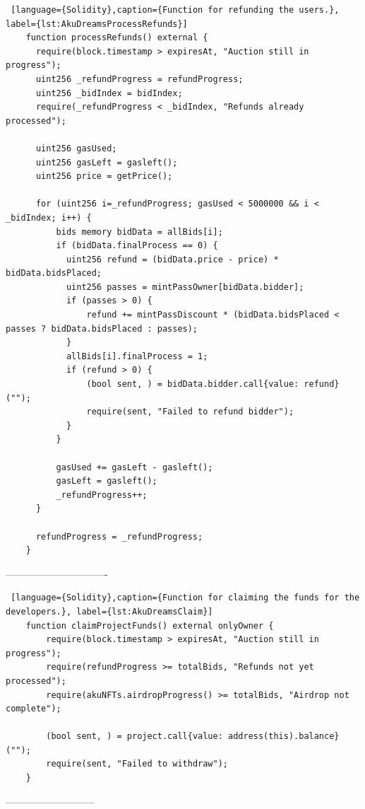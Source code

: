 \begin{lstlisting} [language={Solidity},caption={Function for refunding the users.}, label={lst:AkuDreamsProcessRefunds}]
    function processRefunds() external {
      require(block.timestamp > expiresAt, "Auction still in progress");
      uint256 _refundProgress = refundProgress;
      uint256 _bidIndex = bidIndex;
      require(_refundProgress < _bidIndex, "Refunds already processed");
      
      uint256 gasUsed;
      uint256 gasLeft = gasleft();
      uint256 price = getPrice();
      
      for (uint256 i=_refundProgress; gasUsed < 5000000 && i < _bidIndex; i++) {
          bids memory bidData = allBids[i];
          if (bidData.finalProcess == 0) {
            uint256 refund = (bidData.price - price) * bidData.bidsPlaced;
            uint256 passes = mintPassOwner[bidData.bidder];
            if (passes > 0) {
                refund += mintPassDiscount * (bidData.bidsPlaced < passes ? bidData.bidsPlaced : passes);
            }
            allBids[i].finalProcess = 1;
            if (refund > 0) {
                (bool sent, ) = bidData.bidder.call{value: refund}("");
                require(sent, "Failed to refund bidder");
            }
          }
          
          gasUsed += gasLeft - gasleft();
          gasLeft = gasleft();
          _refundProgress++;
      }

      refundProgress = _refundProgress;
    }
\end{lstlisting}
-------------------------------
\begin{lstlisting} [language={Solidity},caption={Function for claiming the funds for the developers.}, label={lst:AkuDreamsClaim}]
    function claimProjectFunds() external onlyOwner {
        require(block.timestamp > expiresAt, "Auction still in progress");
        require(refundProgress >= totalBids, "Refunds not yet processed");
        require(akuNFTs.airdropProgress() >= totalBids, "Airdrop not complete");

        (bool sent, ) = project.call{value: address(this).balance}("");
        require(sent, "Failed to withdraw");        
    }
\end{lstlisting}
---------------------------
